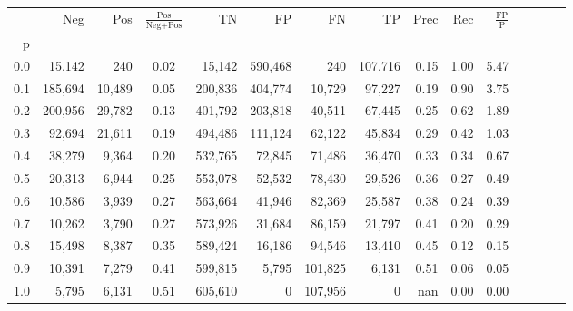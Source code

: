 \begin{tabular}{rrrcrrrrrrrrrrr}
\toprule
{} &      Neg &     Pos & $\frac{\text{Pos}}{\text{Neg}+\text{Pos}}$ &       TN &       FP &       FN &       TP &  Prec &   Rec & $\frac{\text{FP}}{\text{P}}$ \\
p   &          &         &                                            &          &          &          &          &       &       &                              \\
\midrule
0.0 &   15,142 &     240 &                                       0.02 &   15,142 &  590,468 &      240 &  107,716 &  0.15 &  1.00 &                         5.47 \\
0.1 &  185,694 &  10,489 &                                       0.05 &  200,836 &  404,774 &   10,729 &   97,227 &  0.19 &  0.90 &                         3.75 \\
0.2 &  200,956 &  29,782 &                                       0.13 &  401,792 &  203,818 &   40,511 &   67,445 &  0.25 &  0.62 &                         1.89 \\
0.3 &   92,694 &  21,611 &                                       0.19 &  494,486 &  111,124 &   62,122 &   45,834 &  0.29 &  0.42 &                         1.03 \\
0.4 &   38,279 &   9,364 &                                       0.20 &  532,765 &   72,845 &   71,486 &   36,470 &  0.33 &  0.34 &                         0.67 \\
0.5 &   20,313 &   6,944 &                                       0.25 &  553,078 &   52,532 &   78,430 &   29,526 &  0.36 &  0.27 &                         0.49 \\
0.6 &   10,586 &   3,939 &                                       0.27 &  563,664 &   41,946 &   82,369 &   25,587 &  0.38 &  0.24 &                         0.39 \\
0.7 &   10,262 &   3,790 &                                       0.27 &  573,926 &   31,684 &   86,159 &   21,797 &  0.41 &  0.20 &                         0.29 \\
0.8 &   15,498 &   8,387 &                                       0.35 &  589,424 &   16,186 &   94,546 &   13,410 &  0.45 &  0.12 &                         0.15 \\
0.9 &   10,391 &   7,279 &                                       0.41 &  599,815 &    5,795 &  101,825 &    6,131 &  0.51 &  0.06 &                         0.05 \\
1.0 &    5,795 &   6,131 &                                       0.51 &  605,610 &        0 &  107,956 &        0 &   nan &  0.00 &                         0.00 \\
\bottomrule
\end{tabular}
